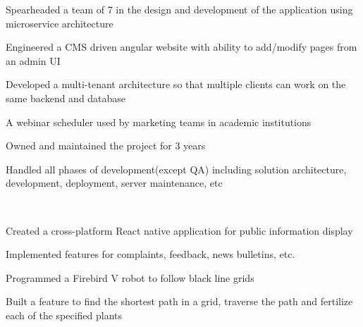 \documentclass[]{deedy-resume-openfont}
\begin{document}
\begin{minipage}[t]{0.66\textwidth}
\begin{tightemize}
    \item Spearheaded a team of 7 in the design and development of the application using microservice architecture
    \item Engineered a CMS driven angular website with ability to add/modify pages from an admin UI
    \item Developed a multi-tenant architecture so that multiple clients can work on the same backend and database
\end{tightemize}
\sectionsep

\begin{tightemize}
    \item A webinar scheduler used by marketing teams in academic institutions
    \item Owned and maintained the project for 3 years
    \item Handled all phases of development(except QA) including solution architecture, development, deployment, server maintenance, etc
\end{tightemize}
\sectionsep

\\
\begin{tightemize}
    \item Created a cross-platform React native application for public information display
    \item Implemented features for complaints, feedback, news bulletins, etc.
\end{tightemize}
\sectionsep

\begin{tightemize}
    \item Programmed a Firebird V robot to follow black line grids
    \item Built a feature to find the shortest path in a grid, traverse the path and fertilize each of the specified plants
\end{tightemize}
\sectionsep



\end{minipage}
\end{document}
